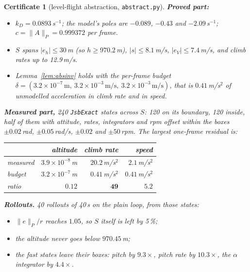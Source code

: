 \documentclass[11pt]{article}
\newtheorem{cert}{Certificate}
\begin{document}
\begin{cert}[level-flight abstraction, \texttt{abstract.py}]\label{cert:abstract}
\textbf{Proved part:}
\begin{itemize}
\item $k_D = 0.0893$\,s$^{-1}$; the model's poles are $-0.089$, $-0.43$ and $-2.09$\,s$^{-1}$; $c = \|A\|_P = 0.999372$ per frame.
\item $S$ spans $|e_h| \le 30$\,m (so $h \ge 970.2$\,m), $|s| \le 8.1$\,m/s, $|e_V| \le 7.4$\,m/s, and climb rates up to 12.9\,m/s.
\item Lemma~\ref{lem:absinv} holds with the per-frame budget $\delta = (3.2\times10^{-7}\,\mathrm{m},\ 3.2\times10^{-3}\,\mathrm{m/s},\ 3.2\times10^{-3}\,\mathrm{m/s})$, that is $0.41$\,m/s$^2$ of unmodelled acceleration in climb rate and in speed.
\end{itemize}

\textbf{Measured part,} 240 \texttt{JsbExact} states across $S$: 120 on its boundary, 120 inside, half of them with attitude, rates, integrators and rpm offset within the boxes $\pm0.02$\,rad, $\pm0.05$\,rad/s, $\pm0.02$ and $\pm50$\,rpm. The largest one-frame residual is:

\begin{center}
\begin{tabular}{lrrr}
\toprule
& altitude & climb rate & speed\\
\midrule
measured & $3.9\times10^{-8}$\,m & $20.2$\,m/s$^2$ & $2.1$\,m/s$^2$\\
budget & $3.2\times10^{-7}$\,m & $0.41$\,m/s$^2$ & $0.41$\,m/s$^2$\\
ratio & $0.12$ & $\mathbf{49}$ & $\mathbf{5.2}$\\
\bottomrule
\end{tabular}
\end{center}

\textbf{Rollouts.} 40 rollouts of 40\,s on the plain loop, from those states:
\begin{itemize}
\item $\|e\|_P/r$ reaches $1.05$, so $S$ itself is left by 5\,\%;
\item the altitude never goes below $970.45$\,m;
\item the fast states leave their boxes: pitch by $9.3\times$, pitch rate by $10.3\times$, the $\alpha$ integrator by $4.4\times$.
\end{itemize}
\end{cert}
\end{document}
